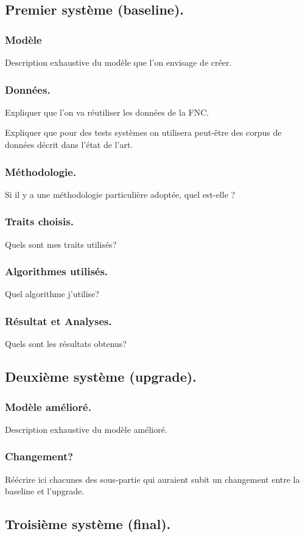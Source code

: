 \documentclass[onecolumn, 12pt]{article}
\begin{document}
\subsection{Premier système (baseline).}
\subsubsection{Modèle}
Description exhaustive du modèle que l'on envisage de créer.
\subsubsection{Données.}
Expliquer que l'on va réutiliser les données de la FNC.

Expliquer que pour des tests systèmes on utilisera peut-être des corpus de
données décrit dans l'état de l'art.
\subsubsection{Méthodologie.}
Si il y a une méthodologie particulière adoptée, quel est-elle ?
\subsubsection{Traits choisis.}
Quels sont mes traits utilisés?
\subsubsection{Algorithmes utilisés.}
Quel algorithme j'utilise?
\subsubsection{Résultat et Analyses.}
Quels sont les résultats obtenus?

\subsection{Deuxième système (upgrade).}
  \subsubsection{Modèle amélioré.}
  Description exhaustive du modèle amélioré.
  \subsubsection{Changement?}
  Réécrire ici chacunes des sous-partie qui auraient subit un changement entre
  la baseline et l'upgrade.

\subsection{Troisième système (final).}
\end{document}
